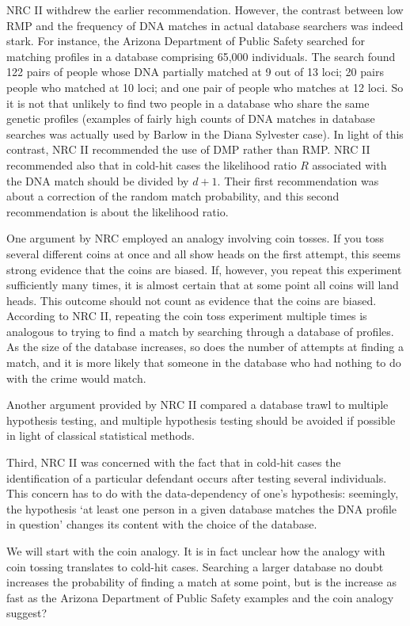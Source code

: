 \documentclass[10pt,dvipsnames,enabledeprecatedfontcommands]{scrartcl}
\begin{document}
NRC II withdrew the earlier recommendation. However, the contrast
between low RMP and the frequency of DNA matches in actual database
searchers was indeed stark. For instance, the Arizona Department of
Public Safety searched for matching profiles in a database comprising
65,000 individuals. The search found 122 pairs of people whose DNA
partially matched at 9 out of 13 loci; 20 pairs people who matched at 10
loci; and one pair of people who matches at 12 loci. So it is not that
unlikely to find two people in a database who share the same genetic
profiles (examples of fairly high counts of DNA matches in database
searches was actually used by Barlow in the Diana Sylvester case). In
light of this contrast, NRC II recommended the use of DMP rather than
RMP. NRC II recommended also that in cold-hit cases the likelihood ratio
\(R\) associated with the DNA match should be divided by \(d+1\). Their
first recommendation was about a correction of the random match
probability, and this second recommendation is about the likelihood
ratio.

One argument by NRC employed an analogy involving coin tosses. If you
toss several different coins at once and all show heads on the first
attempt, this seems strong evidence that the coins are biased. If,
however, you repeat this experiment sufficiently many times, it is
almost certain that at some point all coins will land heads. This
outcome should not count as evidence that the coins are biased.
According to NRC II, repeating the coin toss experiment multiple times
is analogous to trying to find a match by searching through a database
of profiles. As the size of the database increases, so does the number
of attempts at finding a match, and it is more likely that someone in
the database who had nothing to do with the crime would match.

Another argument provided by NRC II compared a database trawl to
multiple hypothesis testing, and multiple hypothesis testing should be
avoided if possible in light of classical statistical methods.

Third, NRC II was concerned with the fact that in cold-hit cases the
identification of a particular defendant occurs after testing several
individuals. This concern has to do with the data-dependency of one's
hypothesis: seemingly, the hypothesis `at least one person in a given
database matches the DNA profile in question' changes its content with
the choice of the database.

We will start with the coin analogy. It is in fact unclear how the
analogy with coin tossing translates to cold-hit cases. Searching a
larger database no doubt increases the probability of finding a match at
some point, but is the increase as fast as the Arizona Department of
Public Safety examples and the coin analogy suggest?
\end{document}
